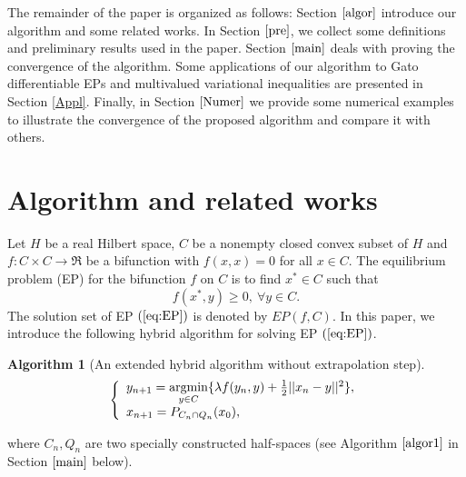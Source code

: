 \documentclass{aims}
\theoremstyle{definition}
\newtheorem{algorithm}{Algorithm}
\begin{document}
The remainder of the paper is organized as follows: Section $\ref{algor}$ introduce our algorithm and some related works.  In Section $\ref{pre}$, 
we collect some definitions and preliminary results used in the paper. Section $\ref{main}$ deals 
with proving the convergence of the algorithm. Some applications of our algorithm to Gato differentiable EPs and multivalued variational 
inequalities are presented in Section \ref{Appl}. 
Finally, in Section $\ref{Numer}$ we provide some numerical examples to illustrate the 
convergence of the proposed algorithm and compare it with others.
\section{Algorithm and related works} \label{algor}
Let $H$ be a real Hilbert space, $C$ be a nonempty closed convex subset of  $H$ and $f:C\times C\to \Re$ be a bifunction with $f(x,x)=0$ for all $x\in C$. 
The equilibrium problem (EP) for the bifunction $f$ on $C$ is to find $x^*\in C$ such that
\begin{equation}\label{eq:EP}
f(x^*,y)\ge 0,~\forall y\in C.
\end{equation}
The solution set of EP $(\ref{eq:EP})$ is denoted by $EP(f,C)$. In this paper, we introduce 
the following hybrid algorithm for solving EP $(\ref{eq:EP})$.
\begin{algorithm}[An extended hybrid algorithm without extrapolation step]\label{H2015}
$$
\left \{
\begin{array}{ll}
y_{n+1}=  \underset{y\in C}{\rm argmin} \{ \lambda f(y_n, y) +\frac{1}{2}||x_n-y||^2\},\\
x_{n+1}=P_{C_n\cap Q_n}(x_0),
\end{array}
\right.
$$
\end{algorithm}
\noindent where $C_n,Q_n$ are two specially constructed half-spaces (see Algorithm $\ref{algor1}$ in Section $\ref{main}$ below). 
\end{document}
